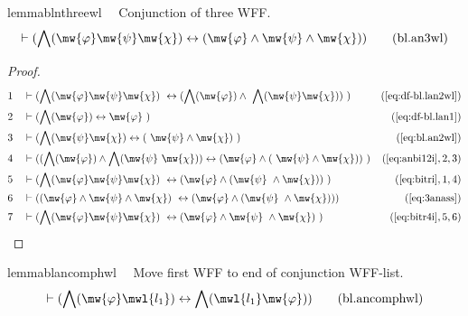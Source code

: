 \begin{restatable}{lemma}{blnthreewl}~~ Conjunction of three WFF.
\begin{align}
\vdash ( \bigwedge( \mw{\varphi} \mw{\psi} \mw{\chi} ) \leftrightarrow (
    \mw{\varphi} \wedge \mw{\psi} \wedge \mw{\chi} )
    )\label{eq:bl.an3wl}\tag{bl.an3wl}
\end{align}
\end{restatable}

\begin{proof}
\begin{align}
  1 &&  & \vdash ( \bigwedge( \mw{\varphi} \mw{\psi} \mw{\chi} )
     ~\leftrightarrow ( \bigwedge( \mw{\varphi} ) \wedge
     ~\bigwedge( \mw{\psi} \mw{\chi} ) )
     ~)&(\mbox{\ref{eq:df-bl.lan2wl}})\notag
  \\ 2 &&  & \vdash ( \bigwedge( \mw{\varphi} ) \leftrightarrow \mw{\varphi}
     ~)&(\mbox{\ref{eq:df-bl.lan1}})\notag
  \\ 3 &&  & \vdash ( \bigwedge( \mw{\psi} \mw{\chi} ) \leftrightarrow (
     ~\mw{\psi} \wedge \mw{\chi} )
     ~)&(\mbox{\ref{eq:bl.an2wl}})\notag
  \\ 4 &&  & \vdash ( ( \bigwedge( \mw{\varphi} ) \wedge \bigwedge( \mw{\psi}
     ~\mw{\chi} ) ) \leftrightarrow ( \mw{\varphi} \wedge (
     ~\mw{\psi} \wedge \mw{\chi} ) )
     ~)&(\mbox{\ref{eq:anbi12i}},2,3)\notag
  \\ 5 &&  & \vdash ( \bigwedge( \mw{\varphi} \mw{\psi} \mw{\chi} )
     ~\leftrightarrow ( \mw{\varphi} \wedge ( \mw{\psi}
     ~\wedge \mw{\chi} ) )
     ~)&(\mbox{\ref{eq:bitri}},1,4)\notag
  \\ 6 &&  & \vdash ( ( \mw{\varphi} \wedge \mw{\psi} \wedge \mw{\chi} )
     ~\leftrightarrow ( \mw{\varphi} \wedge ( \mw{\psi}
     ~\wedge \mw{\chi} ) ) )&(\mbox{\ref{eq:3anass}})\notag
  \\ 7 &&  & \vdash ( \bigwedge( \mw{\varphi} \mw{\psi} \mw{\chi} )
     ~\leftrightarrow ( \mw{\varphi} \wedge \mw{\psi}
     ~\wedge \mw{\chi} )
     ~)&(\mbox{\ref{eq:bitr4i}},5,6)\notag
\end{align}
\end{proof}

\begin{restatable}{lemma}{blancomphwl}~~ Move first WFF to end of conjunction
WFF-list.
\begin{align}
\vdash ( \bigwedge( \mw{\varphi} \mwl{l_1} ) \leftrightarrow \bigwedge(
    \mwl{l_1} \mw{\varphi} ) )\label{eq:bl.ancomphwl}\tag{bl.ancomphwl}
\end{align}
\end{restatable}

